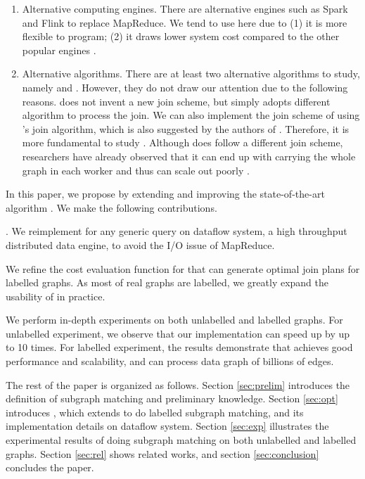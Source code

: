 \begin{enumerate}
    \item Alternative computing engines. There are alternative engines such as Spark \cite{spark} and Flink \cite{flink} to replace MapReduce. We tend to use \timely here due to (1) it is more flexible to program; (2) it draws lower system cost compared to the other popular engines \cite{McSherry2015}.
    \item Alternative algorithms. There are at least two alternative algorithms to study, namely \bigjoin and \multiwayjoin. However, they do not draw our attention due to the following reasons. \bigjoin does not invent a new join scheme, but simply adopts different algorithm to process the join. We can also implement the join scheme of \cliquejoin using \bigjoin's join algorithm, which is also suggested by the authors of \bigjoin \cite{Ammar2018}. Therefore, it is more fundamental to study \cliquejoin. Although \multiwayjoin does follow a different join scheme, researchers have already observed that it can end up with carrying the whole graph in each worker and thus can scale out poorly \cite{Lai2016, Ammar2018}.   
\end{enumerate}

 In this paper, we propose \gencliqjoin by extending and improving the state-of-the-art algorithm \cliquejoin. We make the following contributions.

. We reimplement \cliquejoin for any generic query on \timely dataflow system, a high throughput distributed data engine, to avoid the I/O issue of MapReduce. 

 We refine the cost evaluation function for \cliquejoin that can generate optimal join plans for labelled graphs. As most of real graphs are labelled, we greatly expand the usability of \cliquejoin in practice.

 We perform in-depth experiments on both unlabelled and labelled graphs. For unlabelled experiment, we observe that our implementation can speed up \cliquejoin by up to 10 times. For labelled experiment, the results demonstrate that \gencliqjoin achieves good performance and scalability, and can process data graph of billions of edges.

 The rest of the paper is organized as follows. Section \ref{sec:prelim} introduces the definition of subgraph matching and preliminary knowledge. Section \ref{sec:opt} introduces \gencliqjoin, which extends \cliquejoin to do labelled subgraph matching, and its implementation details on \timely dataflow system. Section \ref{sec:exp} illustrates the experimental results of doing subgraph matching on both unlabelled and labelled graphs. Section \ref{sec:rel} shows related works, and section \ref{sec:conclusion} concludes the paper.